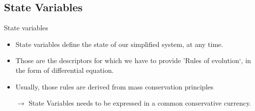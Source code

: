 \documentclass[final,xcolor=dvipsnames]{beamer}
\begin{document}
      \subsection{State Variables}
      \begin{frame}
	\begin{block}{State variables}
	  \begin{itemize}
	    \item State variables define the state of our simplified system, at any time. 
	    \item Those are the descriptors for which we have to provide 'Rules of evolution`, 
	    in the form of differential equation.%
	    \item Usually, those rules are derived from mass conservation principles
	    \item[$\rightarrow$] State Variables needs to be expressed in a common conservative currency.
	  \end{itemize}
	\end{block}
      \end{frame}
\end{document}
